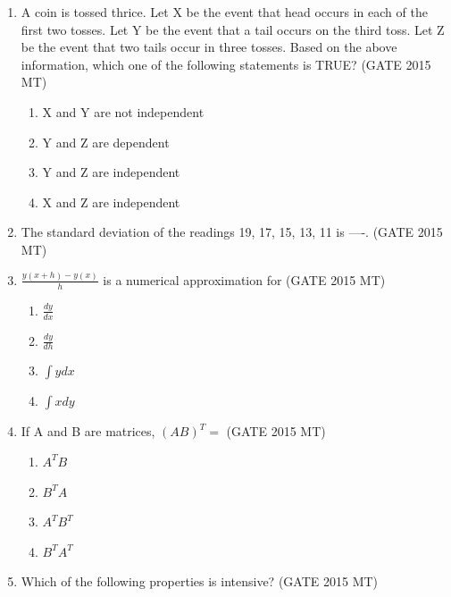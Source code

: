 \documentclass[12pt]{article}
\begin{document}
\begin{enumerate}
\item A coin is tossed thrice. Let X be the event that head occurs in each of the first two tosses. Let Y be the event that a tail occurs on the third toss. Let Z be the event that two tails occur in three tosses. Based on the above information, which one of the following statements is TRUE? (GATE 2015 MT)

\vspace{0.5em}
\begin{enumerate}[label=(\alph*)]
    \item X and Y are not independent
    \item Y and Z are dependent
    \item Y and Z are independent
    \item X and Z are independent
\end{enumerate}
\vspace{0.5em}

\item The standard deviation of the readings 19, 17, 15, 13, 11 is ----. (GATE 2015 MT)

\vspace{0.5em}

\item $\frac{y(x+h)-y(x)}{h}$ is a numerical approximation for (GATE 2015 MT)

\vspace{0.5em}
\begin{enumerate}[label=(\alph*)]
    \item $\frac{dy}{dx}$
    \item $\frac{dy}{dh}$
    \item $\int y dx$
    \item $\int x dy$
\end{enumerate}
\vspace{0.5em}

\item If A and B are matrices, $(AB)^T =$ (GATE 2015 MT)

\vspace{0.5em}
\begin{enumerate}[label=(\alph*)]
    \item $A^T B$
    \item $B^T A$
    \item $A^T B^T$
    \item $B^T A^T$
\end{enumerate}
\vspace{0.5em}

\item Which of the following properties is intensive? (GATE 2015 MT)


\end{enumerate}
\end{document}
